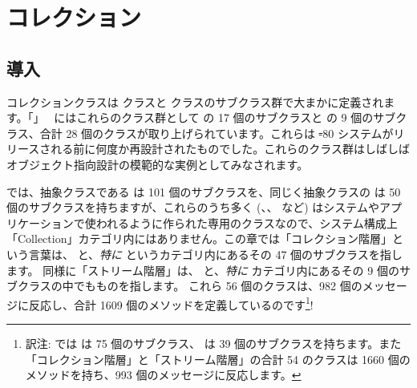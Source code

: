 \documentclass[a4paper,10pt,twoside]{book}
\begin{document}
	\sloppy
\fi
\chapter{コレクション}


\section{導入}

コレクションクラスは  クラスと  クラスのサブクラス群で大まかに定義されます。「」~\cite{Gold83a} にはこれらのクラス群として  の 17 個のサブクラスと   の 9 個のサブクラス、合計 28 個のクラスが取り上げられています。これらは \st-80 システムがリリースされる前に何度か再設計されたものでした。これらのクラス群はしばしばオブジェクト指向設計の模範的な実例としてみなされます。%

\pharo では、抽象クラスである  は 101 個のサブクラスを、同じく抽象クラスの  は 50 個のサブクラスを持ちますが、これらのうち多く (\mbox{、}\mbox{、} など) はシステムやアプリケーションで使われるように作られた専用のクラスなので、システム構成上「Collection」カテゴリ内にはありません。この章では「コレクション階層」という言葉は、 と、\emph{特に}  というカテゴリ内にあるその 47 個のサブクラスを指します。
同様に「ストリーム階層」は、  と、\emph{特に}  カテゴリ内にあるその 9 個のサブクラスの中でもものを指します。%
これら 56 個のクラスは、982 個のメッセージに反応し、合計 1609 個のメソッドを定義しているのです\footnote{訳注:  では は 75 個のサブクラス、 は 39 個のサブクラスを持ちます。また「コレクション階層」と「ストリーム階層」の合計 54 のクラスは 1660 個のメソッドを持ち、993 個のメッセージに反応します。}!
\end{document}
